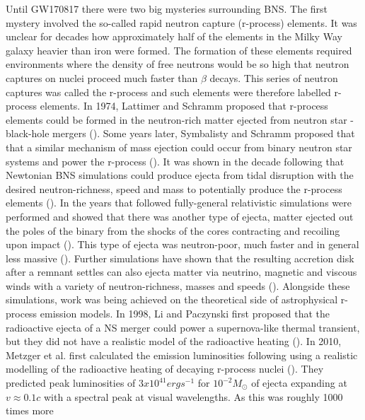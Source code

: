 Until GW170817 there were two big mysteries surrounding BNS. The first mystery involved the so-called rapid neutron capture (r-process) elements. It was unclear for decades how approximately half of the elements in the Milky Way galaxy heavier than iron were formed. The formation of these elements required environments where the density of free neutrons would be so high that neutron captures on nuclei proceed much faster than $\beta$ decays. This series of neutron captures was called the r-process and such elements were therefore labelled r-process elements. In 1974, Lattimer and Schramm proposed that r-process elements could be formed in the neutron-rich matter ejected from neutron star - black-hole mergers (\cite{lattimer1974black}). Some years later, Symbalisty and Schramm proposed that that a similar mechanism of mass ejection could occur from binary neutron star systems and power the r-process (\cite{symbalisty1982neutron}). It was shown in the decade following that Newtonian BNS simulations could produce ejecta from tidal disruption with the desired neutron-richness, speed and mass to potentially produce the r-process elements (\cite{davies1994merging, ruffert1996coalescing, rosswog1998mass, freiburghaus1999r}). In the years that followed fully-general relativistic simulations were performed and showed that there was another type of ejecta, matter ejected out the poles of the binary from the shocks of the cores contracting and recoiling upon impact (\cite{oechslin2006torus,hotokezaka:13,sekiguchi2015dynamical,foucart2015low}). This type of ejecta was neutron-poor, much faster and in general less massive (\cite{foucart2015low}). Further simulations have shown that the resulting accretion disk after a remnant settles can also ejecta matter via neutrino, magnetic and viscous winds with a variety of neutron-richness, masses and speeds (\cite{fernandez2013}). Alongside these simulations, work was being achieved on the theoretical side of astrophysical r-process emission models. In 1998, Li and Paczynski first proposed that the radioactive ejecta of a NS merger could power a supernova-like thermal transient, but they did not have a realistic model of the radioactive heating (\cite{li:1998bw}). In 2010, Metzger et al. first calculated the emission luminosities following using a realistic modelling of the radioactive heating of decaying r-process nuclei (\cite{2010mnras.406.2650m}). They predicted peak luminosities of $3 x 10^{41} erg s^{-1}$ for $10^{-2}M_\odot$  of ejecta expanding at $v \approx 0.1 c$ with a spectral peak at visual wavelengths. As this was roughly 1000 times more
